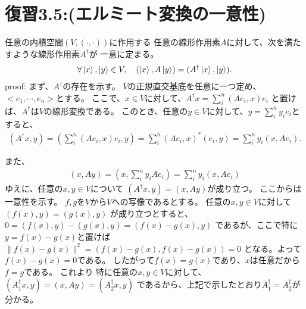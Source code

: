 \hypertarget{hukushuu3.5}{}
\section{\Large 復習3.5:(エルミート変換の一意性)}
任意の内積空間$(V, (\cdot, \cdot))$に作用する
任意の線形作用素$A$に対して、次を満たすような線形作用素$A^\dagger$が
一意に定まる。
\begin{eqnarray*}
\forall \ket{x}, \ket{y} \in V, ~~~
(\ket{x}, A \ket{y}) = (A^\dagger \ket{x}, \ket{y}).
\end{eqnarray*}
{\large proof:}
まず、$A^\dagger$の存在を示す。
\newline
$V$の正規直交基底を任意に一つ定め、$<e_1, \cdots, e_n>$とする。
ここで、$x \in V$に対して、$A^\dagger x = \sum_{i}^n (Ae_i, x) e_i$
と置けば、$A^\dagger$は$V$の線形変換である。
このとき、任意の$y \in V$に対して、$y = \sum_{i}^n y_i e_i$とすると、
\begin{eqnarray*}
(A^\dagger x, y) = (\sum_{i}^n (Ae_i, x) e_i, y)
= \sum_{i}^n (Ae_i, x)^*  (e_i, y)
= \sum_{i}^n y_{i} (x, Ae_i).
\end{eqnarray*}

また、
\begin{eqnarray*}
(x, Ay) = (x, \sum_{i}^n y_i A e_i) = \sum_{i}^n y_i (x, Ae_i)
\end{eqnarray*}
ゆえに、任意の$x, y \in V$について
$(A^\dagger x, y) = (x, Ay)$が成り立つ。
\newline
ここからは一意性を示す。
$f, g$を$V$から$V$への写像であるとする。
任意の$x, y \in V$に対して
$(f(x), y) = (g(x), y)$
が成り立つとすると、
$0 = (f(x), y) - (g(x), y) = (f(x) - g(x), y)$
であるが、ここで特に$y = f(x) - g(x)$と置けば
$\|f(x) - g(x) \|^2 = (f(x) - g(x), f(x) - g(x)) = 0$ 
となる。よって$f(x) - g(x) = 0$である。
したがって$f(x) = g(x)$であり、$x$は任意だから$f=g$である。
これより
特に任意の$x, y \in V$に対して、
$(A_{1}^\dagger x, y) = (x, Ay) = (A_{2}^\dagger x, y)$ 
であるから、上記で示したとおり$A_{1}^\dagger = A_{2}^\dagger$が分かる。
